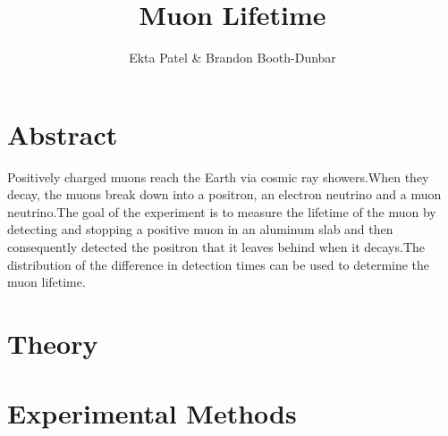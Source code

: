 
\newcommand{\ig}[2][width=4in]{\texttt{[image: \#2]}}    		
\usepackage{graphicx}					
\usepackage{amssymb}
\usepackage{pgfplotstable}
\usepackage{float}
\usepackage{caption}
\captionsetup[table]{justification=justified,singlelinecheck=false, position=bottom}


\header {\today}							
\title{Muon Lifetime}
\author{Ekta Patel \& Brandon Booth-Dunbar}

\section{Abstract}
\begin{em} Positively charged muons reach the Earth via cosmic ray showers.When they decay, the muons break down into a positron, an electron neutrino and a muon neutrino.The goal of the experiment is to measure the lifetime of the muon by detecting and stopping a positive muon in an aluminum slab and then consequently detected the positron that it leaves behind when it decays.The distribution of the difference in detection times can be used to determine the muon lifetime.
\end{em}

\section{Theory}

\section{Experimental Methods}
